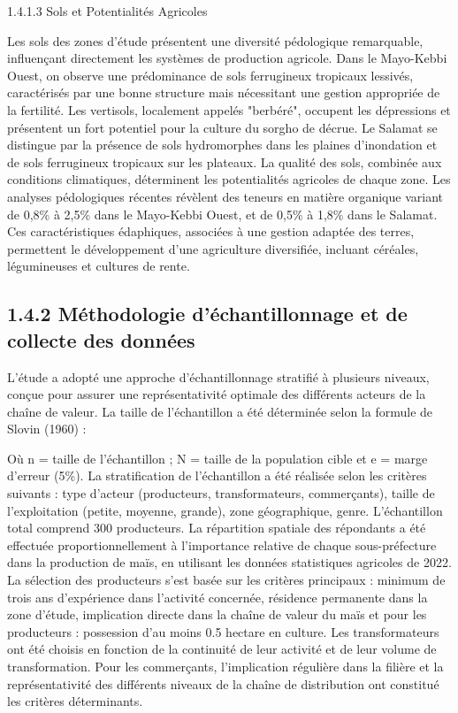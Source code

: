 \documentclass[12pt,oneside]{report}
\begin{document}
1.4.1.3 Sols et Potentialités Agricoles

Les sols des zones d'étude présentent une diversité pédologique remarquable, influençant directement les systèmes de production agricole. Dans le Mayo-Kebbi Ouest, on observe une prédominance de sols ferrugineux tropicaux lessivés, caractérisés par une bonne structure mais nécessitant une gestion appropriée de la fertilité. Les vertisols, localement appelés "berbéré", occupent les dépressions et présentent un fort potentiel pour la culture du sorgho de décrue. Le Salamat se distingue par la présence de sols hydromorphes dans les plaines d'inondation et de sols ferrugineux tropicaux sur les plateaux. La qualité des sols, combinée aux conditions climatiques, déterminent les potentialités agricoles de chaque zone. Les analyses pédologiques récentes révèlent des teneurs en matière organique variant de 0,8\% à 2,5\% dans le Mayo-Kebbi Ouest, et de 0,5\% à 1,8\% dans le Salamat. Ces caractéristiques édaphiques, associées à une gestion adaptée des terres, permettent le développement d'une agriculture diversifiée, incluant céréales, légumineuses et cultures de rente.

\subsection{1.4.2 Méthodologie d’échantillonnage et de collecte des données}
L'étude a adopté une approche d'échantillonnage stratifié à plusieurs niveaux, conçue pour assurer une représentativité optimale des différents acteurs de la chaîne de valeur. La taille de l'échantillon a été déterminée selon la formule de Slovin (1960) :

Où n = taille de l’échantillon ; N = taille de la population cible et e = marge d'erreur (5\%). La stratification de l'échantillon a été réalisée selon les critères suivants : type d'acteur (producteurs, transformateurs, commerçants), taille de l'exploitation (petite, moyenne, grande), zone géographique, genre. L'échantillon total comprend 300 producteurs. La répartition spatiale des répondants a été effectuée proportionnellement à l'importance relative de chaque sous-préfecture dans la production de maïs, en utilisant les données statistiques agricoles de 2022. La sélection des producteurs s'est basée sur les critères principaux : minimum de trois ans d'expérience dans l'activité concernée, résidence permanente dans la zone d'étude, implication directe dans la chaîne de valeur du maïs et pour les producteurs : possession d'au moins 0.5 hectare en culture. Les transformateurs ont été choisis en fonction de la continuité de leur activité et de leur volume de transformation. Pour les commerçants, l'implication régulière dans la filière et la représentativité des différents niveaux de la chaîne de distribution ont constitué les critères déterminants.
\end{document}
